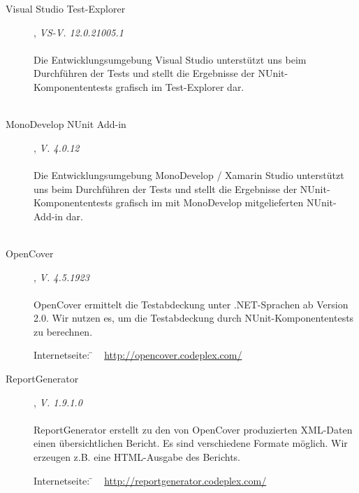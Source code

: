 \begin{description}

	\item[Visual Studio Test-Explorer], \textit{VS-V. 12.0.21005.1}\hfill
	\\
	\\
	Die Entwicklungsumgebung Visual Studio unterstützt uns beim Durchführen der Tests und stellt die Ergebnisse der NUnit-Komponententests grafisch im Test-Explorer dar.
	\\\\

	\item[MonoDevelop NUnit Add-in], \textit{V. 4.0.12}\hfill
	\\
	\\
	Die Entwicklungsumgebung MonoDevelop / Xamarin Studio unterstützt uns beim Durchführen der Tests und stellt die Ergebnisse der NUnit-Komponententests grafisch im mit MonoDevelop mitgelieferten NUnit-Add-in dar.
	\\\\



\label{Abschnitt:Tests:Werkzeuge:Automatisiert:OpenCover}

	\item[OpenCover], \textit{V. 4.5.1923}\hfill
	\\
	\\
	OpenCover ermittelt die Testabdeckung unter .NET-Sprachen ab Version 2.0. Wir nutzen es, um die Testabdeckung durch NUnit-Komponententests zu berechnen.
	
	\begin{tabbing}
		Internetseite:
		\= ~ \href {http://opencover.codeplex.com/}
	    	       {http://opencover.codeplex.com/} \\
	\end{tabbing}
	
	
	\item[ReportGenerator], \textit{V. 1.9.1.0}\hfill
	\\
	\\
	ReportGenerator erstellt zu den von OpenCover produzierten XML-Daten einen übersichtlichen Bericht. Es sind verschiedene Formate möglich. Wir erzeugen z.B. eine HTML-Ausgabe des Berichts.
	\begin{tabbing}
			Internetseite:
			\= ~ \href {http://reportgenerator.codeplex.com/}
		    	       {http://reportgenerator.codeplex.com/}
		    \\
	\end{tabbing}




\end{description}
